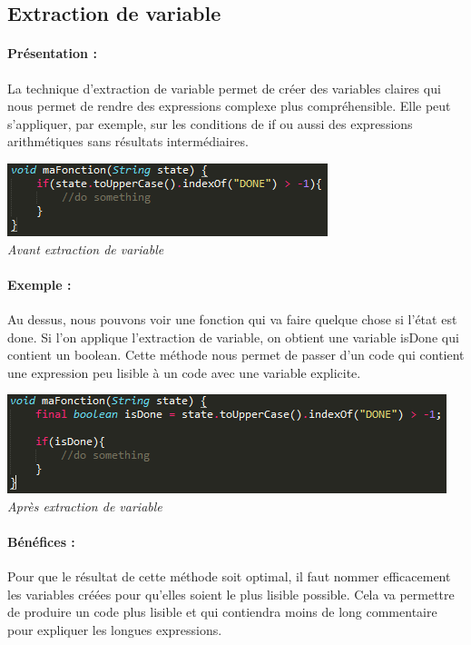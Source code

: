 \documentclass[a4paper,twoside,12pt,openright]{report}
\begin{document}
\subsection{Extraction de variable}
\paragraph{Présentation :}
La technique d'extraction de variable permet de créer des variables claires qui nous permet de rendre des expressions complexe plus compréhensible.
Elle peut s'appliquer, par exemple, sur les conditions de if ou aussi des expressions arithmétiques sans résultats intermédiaires.

\begin{center}
\includegraphics[scale=1]{Image/Extraction_Variable.png}\\
\itshape{Avant extraction de variable}
\end{center}

\paragraph{Exemple :}
Au dessus, nous pouvons voir une fonction qui va faire quelque chose si l'état est done.
Si l'on applique l'extraction de variable, on obtient une variable isDone qui contient un boolean. Cette méthode nous permet de passer d'un code qui contient une expression peu lisible à un code avec une variable explicite.

\begin{center}
\includegraphics[scale=1]{Image/Extraction_Variable2.png}\\
\itshape{Après extraction de variable}
\end{center}

\paragraph{Bénéfices :}
Pour que le résultat de cette méthode soit optimal, il faut nommer efficacement les variables créées pour  qu'elles soient le plus lisible possible. Cela va permettre de produire un code plus lisible et qui contiendra moins de long commentaire pour expliquer les longues expressions.
\end{document}
